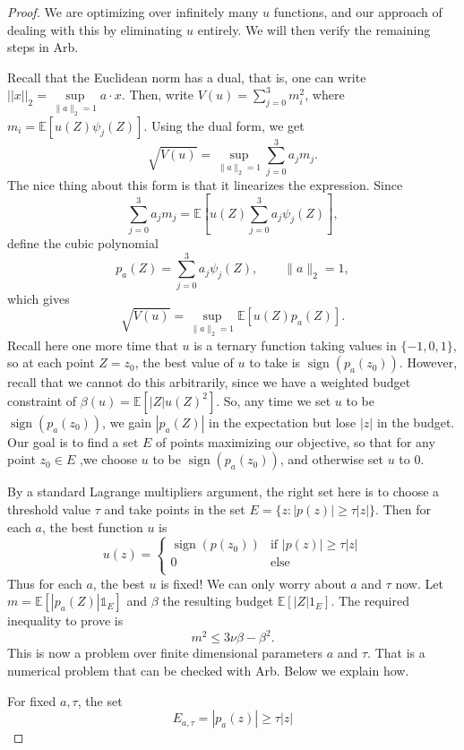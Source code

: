 \documentclass[11pt]{article}
\newcommand{\E}{\mathbb E}
\newcommand{\sgn}{\operatorname{sign}}
\begin{document}
\begin{proof}
    We are optimizing over infinitely many $u$ functions, and our approach of dealing with this by eliminating $u$ entirely. We will then verify the remaining steps in Arb. 

    Recall that the Euclidean norm has a dual, that is, one can write  $||x||_2 = \sup\limits_{\lVert a \rVert_2 = 1} a \cdot x$. Then, write $V(u) = \sum_{j=0}^3 m_i^2$, where $m_i = \E[u(Z)\psi_j(Z)]$. Using the dual form, we get \[\sqrt{V(u)} = \sup\limits_{\lVert a \rVert_2 = 1} \sum\limits_{j=0}^3 a_j m_j.\]
    The nice thing about this form is that it linearizes the expression. Since \[\sum\limits_{j=0}^3 a_j m_j =\mathbb{E}\left[u(Z) \sum\limits_{j=0}^3 a_j \psi_j(Z) \right],\]
    define the cubic polynomial
    \[p_a(Z) = \sum\limits_{j=0}^3 a_j \psi_j(Z), \qquad \lVert a \rVert_2 = 1,\] which gives \[\sqrt{V(u)} = \sup\limits_{\lVert a \rVert_2 = 1} \mathbb{E}[u(Z) p_a(Z)].\]
    Recall here one more time that $u$ is a ternary function taking values in $\{-1, 0, 1\}$, so at each point $Z=z_0$, the best value of $u$ to take is $\sgn(p_a(z_0))$. However, recall that we cannot do this arbitrarily, since we have a weighted budget constraint of $\beta(u) = \mathbb{E}[|Z| u(Z)^2]$. So, any time we set $u$ to be $\sgn(p_a(z_0))$, we gain $|p_a(Z)|$ in the expectation but lose $|z|$ in the budget. Our goal is to find a set $E$ of points maximizing our objective, so that for any point $z_0 \in E$ ,we choose $u$ to be $\sgn(p_a(z_0))$, and otherwise set $u$ to $0$.    

    By a standard Lagrange multipliers argument, the right set here is to  choose a threshold value $\tau$ and take points in the set $E = \{z : |p(z)| \ge \tau  |z|\}$. Then for each $a$, the best function $u$ is \[u(z) = \begin{cases}
        \sgn(p(z_0)) & \text{if } |p(z)| \ge \tau |z| \\
        0 & \text{else} \\  
    \end{cases}\]
    Thus for each $a$, the best $u$ is fixed! We can only worry about $a$  and $\tau$ now. Let $m = \mathbb{E}[|p_a(Z)| \mathbb{1}_{E}]$ and $\beta$ the resulting budget $\mathbb{E}[|Z| 1_{E}]$. The required inequality to prove is \[m^2 \le 3 \nu \beta - \beta^2.\]
    This is now a problem over finite dimensional parameters $a$ and $\tau$. That is a numerical problem that can be checked with Arb. Below we explain how. 

For fixed \(a,\tau\), the set
\[
E_{a,\tau}
=
{|p_a(z)|\ge \tau |z|}
\]


\end{proof}
\end{document}
